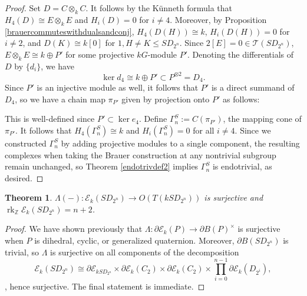 \documentclass[10pt,letterpaper, boxed, cm]{amsart}
\newcommand{\Z}{\mathbb{Z}}
\newcommand{\rk}{\operatorname{rk}}
\newcommand{\calE}{\mathcal{E}}
\newcommand{\calT}{\mathcal{T}}
\newtheorem{theorem}{Theorem}[section]
\theoremstyle{remark}
\theoremstyle{definition}
\begin{document}
\begin{proof}
        Set $D = C\otimes_k C$. It follows by the K\"unneth formula that $H_4(D) \cong E\otimes_k E$ and $H_i(D) = 0$ for $i \neq 4$. Moreover, by Proposition \ref{brauercommuteswithdualsandconj}, $H_4(D(H)) \cong k$, $H_i(D(H)) = 0$ for $i \neq 2$, and $D(K) \cong k[0]$ for $1,H \neq K \leq SD_{2^n}.$ Since $2[E] = 0 \in \calT(SD_{2^n})$, $E \otimes_k E \cong k \oplus P'$ for some projective $kG$-module $P'$. Denoting the differentials of $D$ by $\{d_i\}$, we have \[\ker d_4 \cong k \oplus P'\subset P^{\otimes 2} = D_4.\] Since $P'$ is an injective module as well, it follows that $P'$ is a direct summand of $D_4$, so we have a chain map $\pi_{P'}$ given by projection onto $P'$ as follows:

		\begin{figure}[H]
			\centering
		\end{figure}

		This is well-defined since $P'\subset \ker e_4$. Define $\Gamma_n^S := C(\pi_{P'})$, the mapping cone of $\pi_{P'}$. It follows that $H_4(\Gamma_n^S) \cong k$ and $H_i(\Gamma_n^S) = 0$ for all $i \neq 4$. Since we constructed $\Gamma_n^S$ by adding projective modules to a single component, the resulting complexes when taking the Brauer construction at any nontrivial subgroup remain unchanged, so Theorem \ref{endotrivdef2} implies $\Gamma_n^S$ is endotrivial, as desired.
    \end{proof}

	\begin{theorem}
		$\Lambda(-): \calE_k(SD_{2^n}) \to O(T(kSD_{2^n}))$ is surjective and $\rk_\Z \calE_k(SD_{2^n}) = n+2$.
	\end{theorem}
	\begin{proof}
		We have shown previously that $\Lambda: \partial\calE_k(P)\to \partial B(P)^\times$ is surjective when $P$ is dihedral, cyclic, or generalized quaternion. Moreover, $\partial B(SD_{2^n})$ is trivial, so $\Lambda$ is surjective on all components of the decomposition  \[\calE_{k}(SD_{2^n}) \cong \partial\calE_{kSD_{2^n}}\times \partial\calE_k(C_2)\times \partial\calE_k(C_2) \times \prod_{i=0}^{n - 1} \partial\calE_k(D_{2^i}), \], hence surjective. The final statement is immediate.
	\end{proof}
\end{document}
